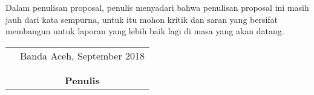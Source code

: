 \begin{onehalfspace}
Dalam penulisan proposal, penulis menyadari bahwa penulisan proposal ini masih jauh dari kata sempurna, untuk itu mohon kritik dan saran yang bersifat membangun untuk laporan yang lebih baik lagi di masa yang akan datang.

\vspace{0.5cm}

\begin{tabular}{p{7.5cm}c}
&Banda Aceh, September 2018\\
&\\
&\\
&\textbf{Penulis}
\end{tabular}

\end{onehalfspace}